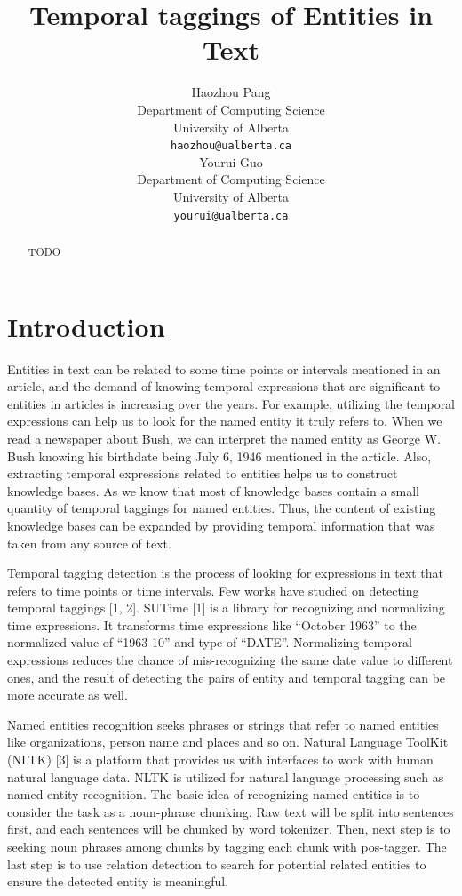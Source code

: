 \documentclass[12pt,a4paper]{article}
\title{Temporal taggings of Entities in Text }
\author{Haozhou Pang \\
  Department of Computing Science \\
  University of Alberta\\
  {\tt haozhou@ualberta.ca} \\\And
 Yourui Guo\\
  Department of Computing Science \\
  University of Alberta\\
  {\tt yourui@ualberta.ca} \\}
\date{}
\begin{document}
\maketitle

\begin{abstract}
TODO

\end{abstract}


\section{Introduction}
 
Entities in text can be related to some time points or intervals mentioned in an article, and the demand of knowing temporal expressions that are significant to entities in articles is increasing over the years. For example, utilizing the temporal expressions can help us to look for the named entity it truly refers to. When we read a newspaper about Bush, we can interpret the named entity as George W. Bush knowing his birthdate being July 6, 1946 mentioned in the article. Also, extracting temporal expressions related to entities helps us to construct knowledge bases. As we know that most of knowledge bases contain a small quantity of temporal taggings for named entities. Thus, the content of existing knowledge bases can be expanded by providing temporal information that was taken from any source of text.

Temporal tagging detection is the process of looking for expressions in text that refers to time points or time intervals. Few works have studied on detecting temporal taggings [1, 2]. SUTime [1] is a library for recognizing and normalizing time expressions. It transforms time expressions like “October 1963” to the normalized value of “1963-10” and type of “DATE”. Normalizing temporal expressions reduces the chance of mis-recognizing the same date value to different ones, and the result of detecting the pairs of entity and temporal tagging can be more accurate as well.

Named entities recognition seeks phrases or strings that refer to named entities like organizations, person name and places and so on. Natural Language ToolKit (NLTK) [3] is a platform that provides us with interfaces to work with human natural language data. NLTK is utilized for natural language processing such as named entity recognition. The basic idea of recognizing named entities is to consider the task as a noun-phrase chunking. Raw text will be split into sentences first, and each sentences will be chunked by word tokenizer. Then, next step is to seeking noun phrases among chunks by tagging each chunk with pos-tagger. The last step is to use relation detection to search for potential related entities to ensure the detected entity is meaningful.
\end{document}
